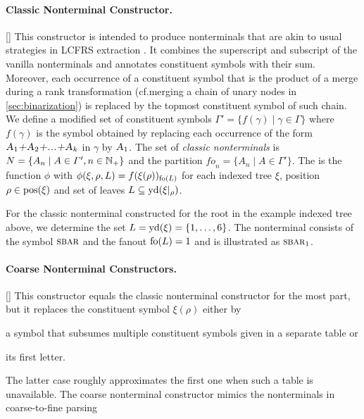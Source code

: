 \documentclass[../../document.tex]{subfiles}
\begin{document}
    \paragraph{Classic Nonterminal Constructor.}[]
    This constructor is intended to produce nonterminals that are akin to usual strategies in LCFRS extraction \cite{MaierSogaard08}.
    It combines the superscript and subscript of the vanilla nonterminals and annotates constituent symbols with their sum.
    Moreover, each occurrence of a constituent symbol that is the product of a merge during a rank transformation (cf.\@ merging a chain of unary nodes in \cref{sec:binarization}) is replaced by the topmost constituent symbol of such chain.
    We define a modified set of constituent symbols \(\varGamma' = \{ f(\gamma) \mid \gamma \in \varGamma \}\) where \(f(\gamma)\) is the symbol obtained by replacing each occurrence of the form \(\textsc{\textsl{A$_1$+A$_2$+...+A$_k$}}\) in \(\gamma\) by \(\textsc{\textsl{A$_1$}}\).
    The set of \emph{classic nonterminals} is \(N = \{ A_n \mid A \in \varGamma', n \in \mathbb{N}_+ \}\) and the partition \(\mathit{fo}_n = \{A_n \mid A \in \varGamma'\}\).
    The  is the function \(\phi\) with \(\phi(\xi, \rho, L) = f(\xi(\rho))_{\operatorname{fo}(L)}\) for each indexed tree \(\xi\), position \(\rho \in \operatorname{pos}(\xi)\) and set of leaves \(L \subseteq \operatorname{yd}(\xi|_\rho)\).

    \begin{example}
    For the classic nonterminal constructed for the root in the example indexed tree above, we determine the set \(L = \operatorname{yd}(\xi) = \{1,\ldots,6\}\).
    The nonterminal consists of the symbol \(\textsc{sbar}\) and the fanout \(\operatorname{fo}(L) = 1\) and is illustrated as \(\textsc{sbar}_1\).
    \end{example}

    \paragraph{Coarse Nonterminal Constructors.}[]
    This constructor equals the classic nonterminal constructor for the most part, but it replaces the constituent symbol \(\xi(\rho)\) either by
    \begin{inparaenum}
        \item a symbol that subsumes multiple constituent symbols given in a separate table or
        \item its first letter.
    \end{inparaenum}
    The latter case roughly approximates the first one when such a table is unavailable.
    The coarse nonterminal constructor mimics the nonterminals in coarse-to-fine parsing \cite{Cha06,Tei17}
\end{document}
